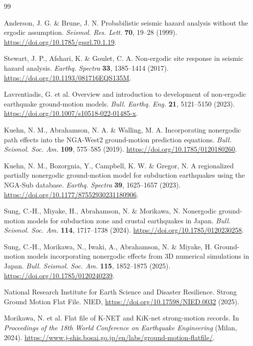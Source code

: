 \documentclass[11pt]{article}
\begin{document}
\footnotesize
{}
\setlength{\parskip}{0pt}
\begin{thebibliography}{99}
\setlength{\itemsep}{0pt}

 Anderson, J. G. \& Brune, J. N. Probabilistic seismic hazard analysis without the ergodic assumption. \textit{Seismol. Res. Lett.} \textbf{70}, 19--28 (1999). \url{https://doi.org/10.1785/gssrl.70.1.19}.

 Stewart, J. P., Afshari, K. \& Goulet, C. A. Non-ergodic site response in seismic hazard analysis. \textit{Earthq. Spectra} \textbf{33}, 1385--1414 (2017). \url{https://doi.org/10.1193/081716EQS135M}.

 Lavrentiadis, G. et al. Overview and introduction to development of non-ergodic earthquake ground-motion models. \textit{Bull. Earthq. Eng.} \textbf{21}, 5121--5150 (2023). \url{https://doi.org/10.1007/s10518-022-01485-x}.

 Kuehn, N. M., Abrahamson, N. A. \& Walling, M. A. Incorporating nonergodic path effects into the NGA-West2 ground-motion prediction equations. \textit{Bull. Seismol. Soc. Am.} \textbf{109}, 575--585 (2019). \url{https://doi.org/10.1785/0120180260}.

 Kuehn, N. M., Bozorgnia, Y., Campbell, K. W. \& Gregor, N. A regionalized partially nonergodic ground-motion model for subduction earthquakes using the NGA-Sub database. \textit{Earthq. Spectra} \textbf{39}, 1625--1657 (2023). \url{https://doi.org/10.1177/87552930231180906}.

 Sung, C.-H., Miyake, H., Abrahamson, N. \& Morikawa, N. Nonergodic ground-motion models for subduction zone and crustal earthquakes in Japan. \textit{Bull. Seismol. Soc. Am.} \textbf{114}, 1717--1738 (2024). \url{https://doi.org/10.1785/0120230258}.

 Sung, C.-H., Morikawa, N., Iwaki, A., Abrahamson, N. \& Miyake, H. Ground-motion models incorporating nonergodic effects from 3D numerical simulations in Japan. \textit{Bull. Seismol. Soc. Am.} \textbf{115}, 1852--1875 (2025). \url{https://doi.org/10.1785/0120240239}.

 National Research Institute for Earth Science and Disaster Resilience. Strong Ground Motion Flat File. NIED, \url{https://doi.org/10.17598/NIED.0032} (2025).

 Morikawa, N. et al. Flat file of K-NET and KiK-net strong-motion records. In \textit{Proceedings of the 18th World Conference on Earthquake Engineering} (Milan, 2024). \url{https://www.j-shis.bosai.go.jp/en/labs/ground-motion-flatfile/}.


\end{thebibliography}
\end{document}
